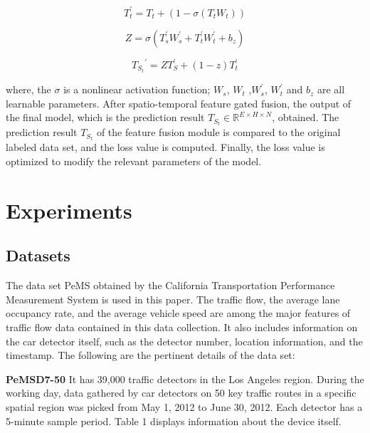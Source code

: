 \documentclass[conference]{IEEEtran}
\begin{document}
\begin{equation}
    T_t^{\prime}= T_t + (1 - \sigma(T_tW_t))
\end{equation}

\begin{equation}
    Z = \sigma(T_s^{\prime}W_s^{\prime} + T^{\prime}_tW^{\prime}_t + b_z)
\end{equation}

\begin{equation}
    {T_{S_t}}^{\prime}= ZT_S^{\prime} + (1 - z)T_t^{\prime}
\end{equation}

where, the $\sigma$ is a nonlinear activation function; $W_s$, $W_t$ ,$W^{\prime}_s$, $W^{\prime}_t$ and $b_z$ are all learnable parameters. After spatio-temporal feature gated fusion, the output of the final model, which is the prediction result $T_{S_t} \in \mathbb{R} ^ {E \times H \times N}$, obtained. The prediction result $T_{S_t}$ of the feature fusion module is compared to the original labeled data set, and the loss value is computed. Finally, the loss value is optimized to modify the relevant parameters of the model.

\section{Experiments}
\subsection{Datasets}
The data set PeMS obtained by the California Transportation Performance Measurement System is used in this paper. The traffic flow, the average lane occupancy rate, and the average vehicle speed are among the major features of traffic flow data contained in this data collection. It also includes information on the car detector itself, such as the detector number, location information, and the timestamp. The following are the pertinent details of the data set:
\par
\textbf{PeMSD7-50} It has 39,000 traffic detectors in the Los Angeles region. During the working day, data gathered by car detectors on 50 key traffic routes in a specific spatial region was picked from May 1, 2012 to June 30, 2012. Each detector has a 5-minute sample period. Table 1 displays information about the device itself.
\par
\end{document}
